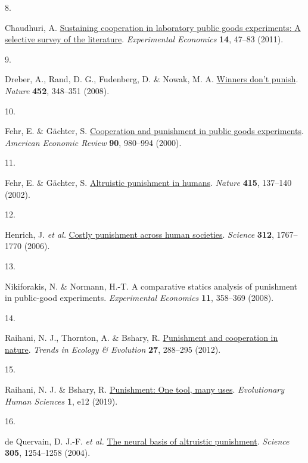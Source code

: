 \documentclass[
  man,floatsintext]{apa6}
\newlength{\cslhangindent}
\newlength{\csllabelwidth}
\newlength{\cslentryspacingunit} %
\newenvironment{CSLReferences}[2] %
 {%
  \setlength{\parindent}{0pt}
  \ifodd #1
  \let\oldpar\par
  \def\par{\hangindent=\cslhangindent\oldpar}
  \fi
  \setlength{\parskip}{#2\cslentryspacingunit}
 }%
 {}
\newcommand{\CSLLeftMargin}[1]{\parbox[t]{\csllabelwidth}{#1}}
\newcommand{\CSLRightInline}[1]{\parbox[t]{\linewidth - \csllabelwidth}{#1}\break}
\begin{document}
\begin{CSLReferences}{0}{0}
\leavevmode{}%
\CSLLeftMargin{8. }%
\CSLRightInline{Chaudhuri, A. \href{https://doi.org/10.1007/s10683-010-9257-1}{Sustaining cooperation in laboratory public goods experiments: A selective survey of the literature}. \emph{Experimental Economics} \textbf{14}, 47--83 (2011).}

\leavevmode{}%
\CSLLeftMargin{9. }%
\CSLRightInline{Dreber, A., Rand, D. G., Fudenberg, D. \& Nowak, M. A. \href{https://doi.org/10.1038/nature06723}{Winners don't punish}. \emph{Nature} \textbf{452}, 348--351 (2008).}

\leavevmode{}%
\CSLLeftMargin{10. }%
\CSLRightInline{Fehr, E. \& Gächter, S. \href{https://www.jstor.org/stable/117319}{Cooperation and punishment in public goods experiments}. \emph{American Economic Review} \textbf{90}, 980--994 (2000).}

\leavevmode{}%
\CSLLeftMargin{11. }%
\CSLRightInline{Fehr, E. \& Gächter, S. \href{https://doi.org/10.1038/415137a}{Altruistic punishment in humans}. \emph{Nature} \textbf{415}, 137--140 (2002).}

\leavevmode{}%
\CSLLeftMargin{12. }%
\CSLRightInline{Henrich, J. \emph{et al.} \href{https://doi.org/10.1126/science.1127333}{Costly punishment across human societies}. \emph{Science} \textbf{312}, 1767--1770 (2006).}

\leavevmode{}%
\CSLLeftMargin{13. }%
\CSLRightInline{Nikiforakis, N. \& Normann, H.-T. A comparative statics analysis of punishment in public-good experiments. \emph{Experimental Economics} \textbf{11}, 358--369 (2008).}

\leavevmode{}%
\CSLLeftMargin{14. }%
\CSLRightInline{Raihani, N. J., Thornton, A. \& Bshary, R. \href{https://doi.org/10.1016/j.tree.2011.12.004}{Punishment and cooperation in nature}. \emph{Trends in Ecology \& Evolution} \textbf{27}, 288--295 (2012).}

\leavevmode{}%
\CSLLeftMargin{15. }%
\CSLRightInline{Raihani, N. J. \& Bshary, R. \href{https://doi.org/10.1017/ehs.2019.12}{Punishment: One tool, many uses}. \emph{Evolutionary Human Sciences} \textbf{1}, e12 (2019).}

\leavevmode{}%
\CSLLeftMargin{16. }%
\CSLRightInline{de Quervain, D. J.-F. \emph{et al.} \href{https://doi.org/10.1126/science.1100735}{The neural basis of altruistic punishment}. \emph{Science} \textbf{305}, 1254--1258 (2004).}


\end{CSLReferences}
\end{document}
